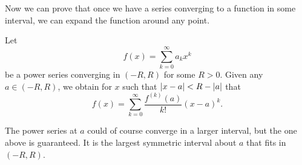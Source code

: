 Now we can prove that once we have a series converging to a function
in some interval, we can expand the function around any point.

\begin{thm}
\label{thm:tayloranal}
Let
\begin{equation*}
f(x) = \sum_{k=0}^\infty a_k x^k
\end{equation*}
be a power series converging in $(-R,R)$ for some $R > 0$.  Given any $a \in
(-R,R)$, we obtain
for $x$ such that $\lvert {x-a} \rvert < R-\lvert {a} \rvert$ that
\begin{equation*}
f(x) =
\sum_{k=0}^\infty \frac{f^{(k)}(a)}{k!} {(x-a)}^{k} .
\end{equation*}
\end{thm}

The power series at $a$ could of course converge in a larger interval, but
the one above is guaranteed.  It is the largest symmetric interval about
$a$ that fits in $(-R,R)$.

